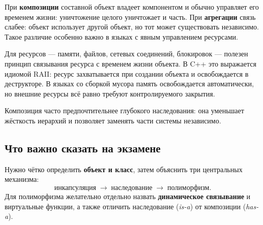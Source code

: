 При \textbf{композиции} составной объект владеет компонентом и обычно управляет
его временем жизни: уничтожение целого уничтожает и часть. При
\textbf{агрегации} связь слабее: объект использует другой объект, но тот может
существовать независимо. Такое различие особенно важно в языках с явным
управлением ресурсами.

Для ресурсов --- памяти, файлов, сетевых соединений, блокировок --- полезен
принцип связывания ресурса с временем жизни объекта. В C++ это выражается
идиомой RAII: ресурс захватывается при создании объекта и освобождается в
деструкторе. В языках со сборкой мусора память освобождается автоматически,
но внешние ресурсы всё равно требуют контролируемого закрытия.

Композиция часто предпочтительнее глубокого наследования: она уменьшает
жёсткость иерархий и позволяет заменять части системы независимо.


\subsection{Что важно сказать на экзамене}

Нужно чётко определить \textbf{объект и класс}, затем объяснить три центральных механизма:
\[
\boxed{\text{инкапсуляция}\;\longrightarrow\;\text{наследование}\;\longrightarrow\;\text{полиморфизм}}.
\]
Для полиморфизма желательно отдельно назвать \textbf{динамическое связывание} и виртуальные функции, а также отличить наследование (\textit{is-a}) от композиции (\textit{has-a}).

\newpage
